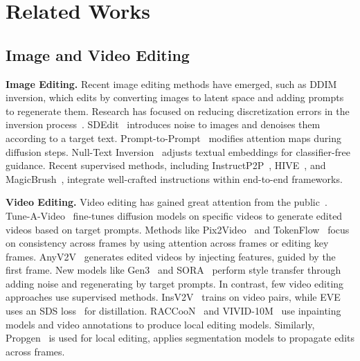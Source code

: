 \section{Related Works}
\subsection{Image and Video Editing}

\textbf{Image Editing.}
Recent image editing methods have emerged, such as DDIM inversion, which edits by converting images to latent space and adding prompts to regenerate them. Research has focused on reducing discretization errors in the inversion process~\cite{other_ddim_huberman2024edit, other_ddim_lu2022dpm, other_ddim_wallace2023edict}. SDEdit~\cite{sdedit_meng2021sdedit} introduces noise to images and denoises them according to a target text. Prompt-to-Prompt~\cite{prompt_to_prompt_hertz2022prompt} modifies attention maps during diffusion steps. Null-Text Inversion~\cite{null_text_inversion_mokady2023null} adjusts textual embeddings for classifier-free guidance. Recent supervised methods, including InstructP2P~\cite{instructpix2pix_brooks2023instructpix2pix}, HIVE~\cite{hive_zhang2024hive}, and MagicBrush~\cite{magic_brush_zhang2024magicbrush}, integrate well-crafted instructions within end-to-end frameworks.

\textbf{Video Editing.}
Video editing has gained great attention from the public~\cite{fatezero_qi2023fatezero, stablev2v_liu2024stablev2v}. Tune-A-Video~\cite{tuneavideo_wu2023tune} fine-tunes diffusion models on specific videos to generate edited videos based on target prompts. Methods like Pix2Video~\cite{pix2video_ceylan2023pix2video} and TokenFlow~\cite{tokenflow_geyer2023tokenflow} focus on consistency across frames by using attention across frames or editing key frames. AnyV2V~\cite{ku2024anyv2v} generates edited videos by injecting features, guided by the first frame. New models like Gen3~\cite{gen3} and SORA~\cite{sora} perform style transfer through adding noise and regenerating by target prompts. In contrast, few video editing approaches use supervised methods. InsV2V~\cite{insv2v_cheng2024consistent} trains on video pairs, while EVE~\cite{eve_singer2025video} uses an SDS loss~\cite{dreamfusion_poole2022dreamfusion} for distillation. RACCooN~\cite{raccon_yoon2024raccoonremoveaddchange} and VIVID-10M~\cite{vivid_10m_hu2024vivid} use inpainting models and video annotations to produce local editing models. Similarly, Propgen~\cite{propgen_liu2024generative} is used for local editing, applies segmentation models to propagate edits across frames.

